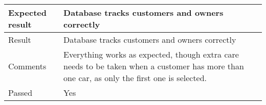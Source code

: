 \begin{table}[H]
\begin{tabularx}{1.0\textwidth}{
    |p{}     %
    |p{}|    %
}
Expected result
& Database tracks customers and owners correctly
\\
\hline

Result
& Database tracks customers and owners correctly
\\
\hline

Comments
& Everything works as expected, though extra care needs to be taken when a customer has more than one car, as only the first one is selected.
\\
\hline

Passed
& Yes
\\
\hline

\end{tabularx}
\end{table}

\clearpage